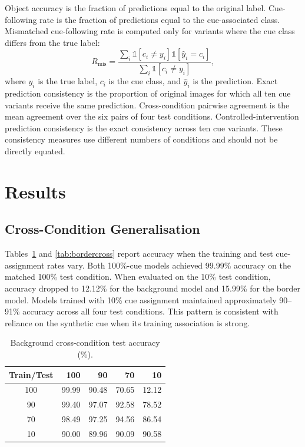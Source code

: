 \documentclass[conference]{IEEEtran}
\begin{document}
Object accuracy is the fraction of predictions equal to the original label. Cue-following rate is the fraction of predictions equal to the cue-associated class. Mismatched cue-following rate is computed only for variants where the cue class differs from the true label:
\begin{equation}
R_{\mathrm{mis}} =
\frac{\sum_i \mathbb{1}[c_i\ne y_i]\mathbb{1}[\hat y_i=c_i]}
{\sum_i \mathbb{1}[c_i\ne y_i]},
\end{equation}
where $y_i$ is the true label, $c_i$ is the cue class, and $\hat y_i$ is the prediction. Exact prediction consistency is the proportion of original images for which all ten cue variants receive the same prediction. Cross-condition pairwise agreement is the mean agreement over the six pairs of four test conditions. Controlled-intervention prediction consistency is the exact consistency across ten cue variants. These consistency measures use different numbers of conditions and should not be directly equated.

\section{Results}

\subsection{Cross-Condition Generalisation}
Tables~\ref{tab:bgcross} and \ref{tab:bordercross} report accuracy when the training and test cue-assignment rates vary. Both 100\%-cue models achieved 99.99\% accuracy on the matched 100\% test condition. When evaluated on the 10\% test condition, accuracy dropped to 12.12\% for the background model and 15.99\% for the border model. Models trained with 10\% cue assignment maintained approximately 90--91\% accuracy across all four test conditions. This pattern is consistent with reliance on the synthetic cue when its training association is strong.

\begin{table}[t]
\caption{Background cross-condition test accuracy (\%).}
\label{tab:bgcross}
\centering
\footnotesize
\begin{tabular}{c|rrrr}
\toprule
Train/Test & 100 & 90 & 70 & 10\\
\midrule
100 & 99.99 & 90.48 & 70.65 & 12.12\\
90  & 99.40 & 97.07 & 92.58 & 78.52\\
70  & 98.49 & 97.25 & 94.56 & 86.54\\
10  & 90.00 & 89.96 & 90.09 & 90.58\\
\bottomrule
\end{tabular}
\end{table}
\end{document}
